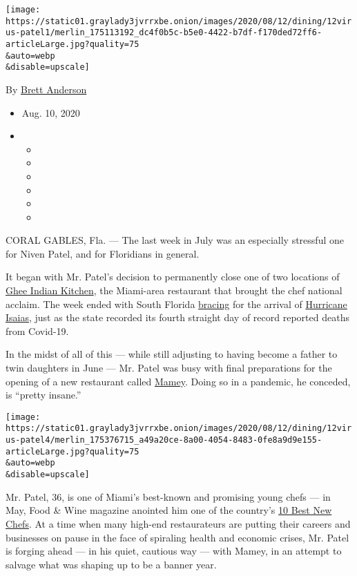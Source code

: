 \texttt{[image: https://static01.graylady3jvrrxbe.onion/images/2020/08/12/dining/12virus-patel1/merlin\_175113192\_dc4f0b5c-b5e0-4422-b7df-f170ded72ff6-articleLarge.jpg?quality=75\\\&auto=webp\\\&disable=upscale]}

By \href{https://www.nytimes3xbfgragh.onion/by/brett-anderson}{Brett
Anderson}

\begin{itemize}
\item
  Aug. 10, 2020
\item
  \begin{itemize}
  \item
  \item
  \item
  \item
  \item
  \item
  \end{itemize}
\end{itemize}

CORAL GABLES, Fla. --- The last week in July was an especially stressful
one for Niven Patel, and for Floridians in general.

It began with Mr. Patel's decision to permanently close one of two
locations of \href{https://www.gheemiami.com/}{Ghee Indian Kitchen}, the
Miami-area restaurant that brought the chef national acclaim. The week
ended with South Florida
\href{https://www.nytimes3xbfgragh.onion/2020/08/02/us/florida-hurricane-isaias-coronavirus.html}{bracing}
for the arrival of
\href{https://www.nytimes3xbfgragh.onion/2020/08/04/us/isaias-storm-updates.html}{Hurricane
Isaias}, just as the state recorded its fourth straight day of record
reported deaths from Covid-19.

In the midst of all of this --- while still adjusting to having become a
father to twin daughters in June --- Mr. Patel was busy with final
preparations for the opening of a new restaurant called
\href{https://www.thesishotelmiami.com/taste/mamey/}{Mamey}. Doing so in
a pandemic, he conceded, is ``pretty insane.''

\texttt{[image: https://static01.graylady3jvrrxbe.onion/images/2020/08/12/dining/12virus-patel4/merlin\_175376715\_a49a20ce-8a00-4054-8483-0fe8a9d9e155-articleLarge.jpg?quality=75\\\&auto=webp\\\&disable=upscale]}

Mr. Patel, 36, is one of Miami's best-known and promising young chefs
--- in May, Food \& Wine magazine anointed him one of the country's
\href{https://www.foodandwine.com/chefs/best-new-chefs-2020-niven-patel}{10
Best New Chefs}. At a time when many high-end restaurateurs are putting
their careers and businesses on pause in the face of spiraling health
and economic crises, Mr. Patel is forging ahead --- in his quiet,
cautious way --- with Mamey, in an attempt to salvage what was shaping
up to be a banner year.

